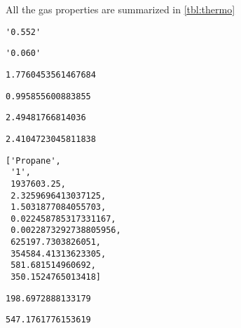 \documentclass[10pt,parskip=half,
toc=sectionentrywithdots,
bibliography=totocnumbered,
captions=tableheading,numbers=noendperiod]{scrartcl}
\begin{document}
All the gas properties are summarized in \cref{tbl:thermo}

\begin{lstlisting}[language={},postbreak={},numbers=none,xrightmargin=7pt,breakindent=0pt,aboveskip=5pt,belowskip=5pt]
'0.552'
\end{lstlisting}

\begin{lstlisting}[language={},postbreak={},numbers=none,xrightmargin=7pt,breakindent=0pt,aboveskip=5pt,belowskip=5pt]
'0.060'
\end{lstlisting}

\begin{lstlisting}[language={},postbreak={},numbers=none,xrightmargin=7pt,breakindent=0pt,aboveskip=5pt,belowskip=5pt]
1.7760453561467684
\end{lstlisting}

\begin{lstlisting}[language={},postbreak={},numbers=none,xrightmargin=7pt,breakindent=0pt,aboveskip=5pt,belowskip=5pt]
0.995855600883855
\end{lstlisting}

\begin{lstlisting}[language={},postbreak={},numbers=none,xrightmargin=7pt,breakindent=0pt,aboveskip=5pt,belowskip=5pt]
2.49481766814036
\end{lstlisting}

\begin{lstlisting}[language={},postbreak={},numbers=none,xrightmargin=7pt,breakindent=0pt,aboveskip=5pt,belowskip=5pt]
2.4104723045811838
\end{lstlisting}

\begin{lstlisting}[language={},postbreak={},numbers=none,xrightmargin=7pt,breakindent=0pt,aboveskip=5pt,belowskip=5pt]
['Propane',
 '1',
 1937603.25,
 2.3259696413037125,
 1.5031877084055703,
 0.022458785317331167,
 0.0022873292738805956,
 625197.7303826051,
 354584.41313623305,
 581.681514960692,
 350.1524765013418]
\end{lstlisting}

\begin{lstlisting}[language={},postbreak={},numbers=none,xrightmargin=7pt,breakindent=0pt,aboveskip=5pt,belowskip=5pt]
198.6972888133179
\end{lstlisting}

\begin{lstlisting}[language={},postbreak={},numbers=none,xrightmargin=7pt,breakindent=0pt,aboveskip=5pt,belowskip=5pt]
547.1761776153619
\end{lstlisting}
\end{document}
